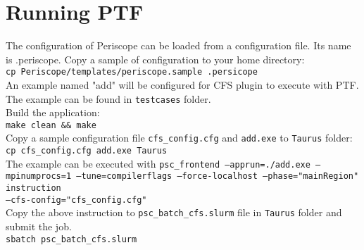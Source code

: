 \documentclass[12pt]{article}
\begin{document}
\section{Running PTF}
The configuration of Periscope can be loaded from a configuration file. Its
name is .periscope. Copy a sample of configuration to your home directory:\\
\texttt{cp Periscope/templates/periscope.sample .persicope }\\
An example named "add" will be configured for CFS plugin to execute with PTF. The example can be found in \texttt{testcases} folder.\\
Build the application: \\
\texttt{make clean \&\& make}\\
Copy a sample configuration file \texttt{cfs\_config.cfg} and \texttt{add.exe} to \texttt{Taurus} folder:\\
\texttt{cp cfs\_config.cfg add.exe Taurus}\\
The example can be executed with
\texttt{psc\_frontend --apprun=./add.exe --mpinumprocs=1 --tune=compilerflags  --force-localhost --phase="mainRegion" instruction\\
--cfs-config="cfs\_config.cfg"}\\
Copy the above instruction to \texttt{psc\_batch\_cfs.slurm} file in \texttt{Taurus} folder and submit the job.\\
\texttt{sbatch psc\_batch\_cfs.slurm}
\end{document}
